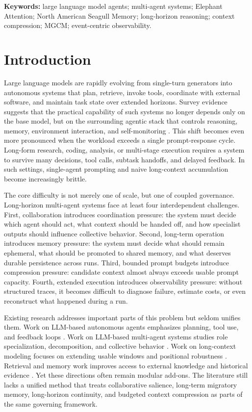 \documentclass[a4paper,fleqn]{cas-sc}
\begin{document}
\noindent\textbf{Keywords:} large language model agents; multi-agent systems; Elephant Attention; North American Seagull Memory; long-horizon reasoning; context compression; MGCM; event-centric observability.

\section{Introduction}

Large language models are rapidly evolving from single-turn generators into autonomous systems that plan, retrieve, invoke tools, coordinate with external software, and maintain task state over extended horizons. Survey evidence suggests that the practical capability of such systems no longer depends only on the base model, but on the surrounding agentic stack that controls reasoning, memory, environment interaction, and self-monitoring \citep{wang2024survey}. This shift becomes even more pronounced when the workload exceeds a single prompt-response cycle. Long-form research, coding, analysis, or multi-stage execution requires a system to survive many decisions, tool calls, subtask handoffs, and delayed feedback. In such settings, single-agent prompting and naive long-context accumulation become increasingly brittle.

The core difficulty is not merely one of scale, but one of coupled governance. Long-horizon multi-agent systems face at least four interdependent challenges. First, collaboration introduces coordination pressure: the system must decide which agent should act, what context should be handed off, and how specialist outputs should influence collective behavior. Second, long-term operation introduces memory pressure: the system must decide what should remain ephemeral, what should be promoted to shared memory, and what deserves durable persistence across runs. Third, bounded prompt budgets introduce compression pressure: candidate context almost always exceeds usable prompt capacity. Fourth, extended execution introduces observability pressure: without structured traces, it becomes difficult to diagnose failure, estimate costs, or even reconstruct what happened during a run.

Existing research addresses important parts of this problem but seldom unifies them. Work on LLM-based autonomous agents emphasizes planning, tool use, and feedback loops \citep{wang2024survey, yao2023react, shinn2023reflexion}. Work on LLM-based multi-agent systems studies role specialization, decomposition, and collective behavior \citep{jimenezromero2025mas, wooldridge2009}. Work on long-context modeling focuses on extending usable windows and positional robustness \citep{li2024sbarope}. Retrieval and memory work improves access to external knowledge and historical evidence \citep{lewis2020rag}. Yet these directions often remain modular add-ons. The literature still lacks a unified method that treats collaborative salience, long-term migratory memory, long-horizon continuity, and budgeted context compression as parts of the same governing framework.
\end{document}
